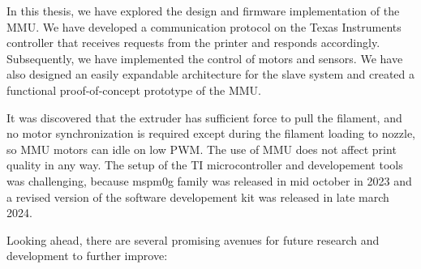 
In this thesis, we have explored the design and firmware implementation of the MMU. We have developed a communication protocol on the Texas Instruments controller that receives requests from the printer and responds accordingly. Subsequently, we have implemented the control of motors and sensors. We have also designed an easily expandable architecture for the slave system and created a functional proof-of-concept prototype of the MMU.

It was discovered that the extruder has sufficient force to pull the filament, and no motor synchronization is required except during the filament loading to nozzle, so MMU motors can idle on low PWM. The use of MMU does not affect print quality in any way. The setup of the TI microcontroller and developement tools was challenging, because mspm0g family was released in mid october in 2023 and a revised version of the software developement kit was released in late march 2024.

Looking ahead, there are several promising avenues for future research and development to further improve:


